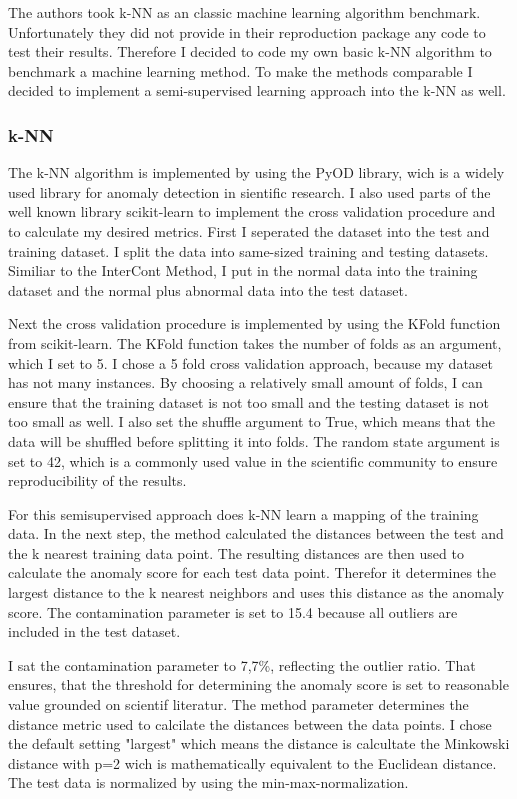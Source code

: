 The authors took k-NN as an classic machine learning algorithm benchmark.
Unfortunately they did not provide in their reproduction package any code to test their results.
Therefore I decided to code my own basic k-NN algorithm to benchmark a machine learning method.
To make the methods comparable I decided to implement a semi-supervised learning approach into the k-NN as well.



\subsubsection*{k-NN}
The k-NN algorithm is implemented by using the PyOD library, wich is a widely used library for anomaly detection in sientific research.
I also used parts of the well known library scikit-learn to implement the cross validation procedure and to calculate my desired metrics.
First I seperated the dataset into the test and training dataset.
I split the data into same-sized training and testing datasets.
Similiar to the InterCont Method, I put in the normal data into the training dataset and the normal plus abnormal data into the test dataset.


Next the cross validation procedure is implemented by using the KFold function from scikit-learn.
The KFold function takes the number of folds as an argument, which I set to 5.
I chose a 5 fold cross validation approach, because my dataset has not many instances. 
By choosing a relatively small amount of folds, I can ensure that the training dataset is not too small and the testing dataset is not too small as well.
I also set the shuffle argument to True, which means that the data will be shuffled before splitting it into folds.
The random state argument is set to 42, which is a commonly used value in the scientific community to ensure reproducibility of the results.

For this semisupervised approach does k-NN learn a mapping of the training data.
In the next step, the method calculated the distances between the test and the k nearest training data point.
The resulting distances are then used to calculate the anomaly score for each test data point.
Therefor it determines the largest distance to the k nearest neighbors and uses this distance as the anomaly score.
The contamination parameter is set to 15.4 because all outliers are included in the test dataset.

I sat the contamination parameter to 7,7\%, reflecting the outlier ratio.
That ensures, that the threshold for determining the anomaly score is set to reasonable value grounded on scientif literatur.
The  method parameter determines the distance metric used to calcilate the distances between the data points.
I chose the default setting "largest" which means the distance is calcultate the Minkowski distance with p=2 wich is mathematically equivalent to the Euclidean distance.
The test data is normalized by using the min-max-normalization.


